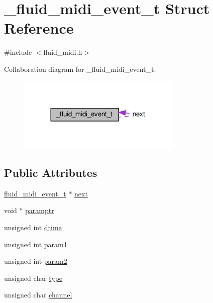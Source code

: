 \hypertarget{struct__fluid__midi__event__t}{}\section{\+\_\+fluid\+\_\+midi\+\_\+event\+\_\+t Struct Reference}
\label{struct__fluid__midi__event__t}


{\ttfamily \#include $<$fluid\+\_\+midi.\+h$>$}



Collaboration diagram for \+\_\+fluid\+\_\+midi\+\_\+event\+\_\+t\+:
\nopagebreak
\begin{figure}[H]
\begin{center}
\leavevmode
\includegraphics[width=221pt]{struct__fluid__midi__event__t__coll__graph}
\end{center}
\end{figure}
\subsection*{Public Attributes}
\begin{DoxyCompactItemize}
\item 
\hyperlink{types_8h_a61c72b76e3ee344637994c3071f74d94}{fluid\+\_\+midi\+\_\+event\+\_\+t} $\ast$ \hyperlink{struct__fluid__midi__event__t_a0d5ef7528dfa953132fb2e2471bffac0}{next}
\item 
void $\ast$ \hyperlink{struct__fluid__midi__event__t_afe5a9dc57be21c06319331d0ff048fc2}{paramptr}
\item 
unsigned int \hyperlink{struct__fluid__midi__event__t_a95a5caa12570905e7b06eddd73474bd9}{dtime}
\item 
unsigned int \hyperlink{struct__fluid__midi__event__t_a94018711464160be5a5ffe6c20dcebbc}{param1}
\item 
unsigned int \hyperlink{struct__fluid__midi__event__t_af5db43d718e962503b7e4e3298c3c026}{param2}
\item 
unsigned char \hyperlink{struct__fluid__midi__event__t_a3fcf1f8cc634a3e0e36788ab58a604a8}{type}
\item 
unsigned char \hyperlink{struct__fluid__midi__event__t_a6cbaf2dd7f396262752b29ca097baa40}{channel}
\end{DoxyCompactItemize}


